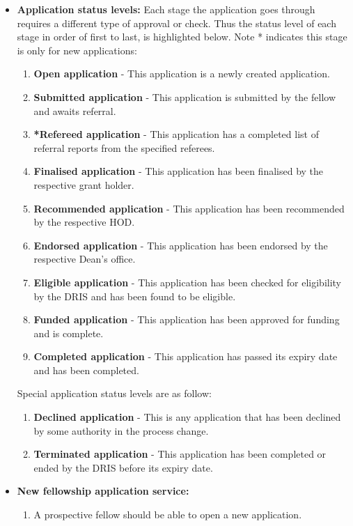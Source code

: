 \documentclass[12pt]{article}
\begin{document}
	
	\begin{itemize}
		\item\textbf{Application status levels:} Each stage the application goes through requires a different type of approval or check. Thus the status level of each stage in order of first to last, is highlighted below. Note * indicates this stage is only for new applications: 
		\begin{enumerate}
			\item \textbf{Open application} - This application is a newly created application.
			\item \textbf{Submitted application} - This application is submitted by the fellow and awaits referral.
			\item \textbf{*Refereed application} - This application has a completed list of referral reports from the specified referees.
			\item \textbf{Finalised application} - This application has been finalised by the respective grant holder.
			\item \textbf{Recommended application} - This application has been recommended by the respective HOD.
			\item \textbf{Endorsed application} - This application has been endorsed by the respective Dean's office.
			\item \textbf{Eligible application} - This application has been checked for eligibility by the DRIS and has been found to be eligible.
			\item \textbf{Funded application} - This application has been approved for funding and is complete.
			\item \textbf{Completed application} - This application has passed its expiry date and has been completed.			
		\end{enumerate}
		Special application status levels are as follow:
		\begin{enumerate}
			\item \textbf{Declined application} - This is any application that has been declined by some authority in the process change.
			\item \textbf{Terminated application} - This application has been completed or ended by the DRIS before its expiry date.		
		\end{enumerate}
		\item\textbf{ New fellowship application service:}		
		\begin{enumerate}			
			\item A prospective fellow should be able to open a new application.

\end{enumerate}
\end{itemize}
\end{document}
